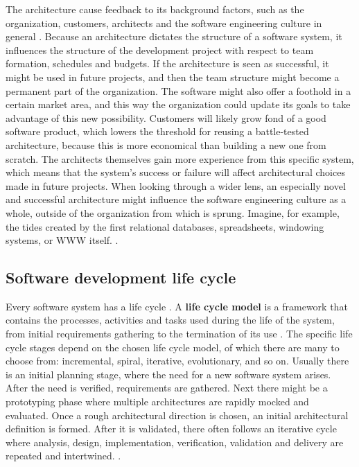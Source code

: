 \documentclass[utf8,english]{gradu3}
\begin{document}
The architecture cause feedback to its background factors, such as the
organization, customers, architects and the software engineering culture in
general \parencite{Bass1998}. Because an architecture dictates the structure of a software
system, it influences the structure of the development project with respect to
team formation, schedules and budgets. If the architecture is seen as
successful, it might be used in future projects, and then the team structure
might become a permanent part of the organization. The software might also offer
a foothold in a certain market area, and this way the organization could update
its goals to take advantage of this new possibility. Customers will likely grow
fond of a good software product, which lowers the threshold for reusing a
battle-tested architecture, because this is more economical than building a new
one from scratch. The architects themselves gain more experience from this
specific system, which means that the system's success or failure will affect
architectural choices made in future projects. When looking through a wider
lens, an especially novel and successful architecture might influence the
software engineering culture as a whole, outside of the organization from which
is sprung. Imagine, for example, the tides created by the first relational
databases, spreadsheets, windowing systems, or WWW itself. \parencite[10-11]{Bass1998}.


\subsection{Software development life cycle}
Every software system has a life cycle \parencite[17]{IEEE12207}. A \textbf{life cycle model} is a
framework that contains the processes, activities and tasks used during the life
of the system, from initial requirements gathering to the termination of its use
\parencite[3]{IEEE42010}. The specific life cycle stages depend on the chosen life cycle
model, of which there are many to choose from: incremental, spiral, iterative,
evolutionary, and so on. Usually there is an initial planning stage, where the
need for a new software system arises. After the need is verified, requirements
are gathered. Next there might be a prototyping phase where multiple
architectures are rapidly mocked and evaluated. Once a rough architectural
direction is chosen, an initial architectural definition is formed. After it is
validated, there often follows an iterative cycle where analysis, design,
implementation, verification, validation and delivery are repeated and
intertwined. \parencite[18]{IEEE12207}.
\end{document}
